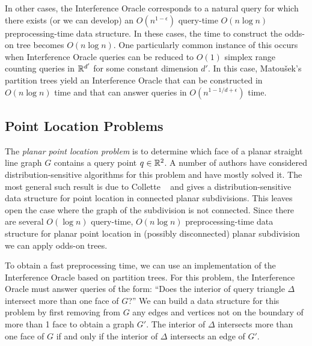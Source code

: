 \documentclass{patmorin}
\begin{document}
In other cases, the Interference Oracle corresponds to a natural query for
which there exists (or we can develop) an $O(n^{1-\epsilon})$ query-time
$O(n\log n)$ preprocessing-time data structure.  In these cases, the time
to construct the odds-on tree becomes $O(n\log n)$.  One particularly
common instance of this occurs when Interference Oracle queries can
be reduced to $O(1)$ simplex range counting queries in $\mathbb{R}^{d'}$ for
some constant dimension $d'$.  In this case, Matou\v{s}ek's partition
trees \cite{m92} yield an Interference Oracle that can be constructed in
$O(n\log n)$ time and that can answer queries in $O(n^{1-1/d+\epsilon})$
time. 

\subsection{Point Location Problems}

The \emph{planar point location problem} is to determine which face
of a planar straight line graph $G$ contains a query point $q\in\mathbb{R}^2$.
A number of authors have considered distribution-sensitive algorithms for
this problem \cite{acmr00,amm00,amm01a,amm01b,ammw07,cdilm08,i01,i04} and
have mostly solved it.  The most general such result is due to Collette
\etal\ \cite{cdilm08} and gives a distribution-sensitive data structure
for point location in connected planar subdivisions.  This leaves open
the case where the graph of the subdivision is not connected.  Since there
are several $O(\log n)$ query-time, $O(n\log n)$ preprocessing-time data
structure for planar point location in (possibly disconnected) planar
subdivision \cite{as98,egs86,k83,m90,st86} we can apply odds-on trees.

To obtain a fast preprocessing time, we can use an
implementation of the Interference Oracle based on partition trees.  For
this problem, the Interference Oracle must answer queries of the form:
``Does the interior of query triangle $\Delta$ intersect more than one face
of $G$?''  We can build a data structure for this problem by first removing
from $G$ any edges and vertices not on the boundary of more than 1 face to
obtain a graph $G'$.  The interior of $\Delta$ intersects more than one
face of $G$ if and only if the interior of $\Delta$ intersects an edge of
$G'$.
\end{document}

